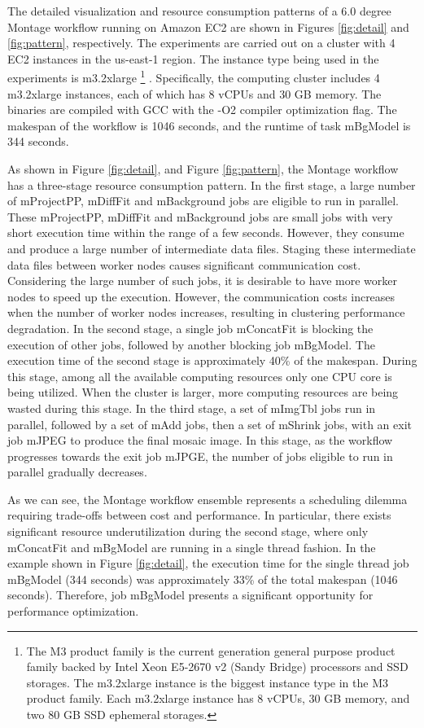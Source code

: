 The detailed visualization and  resource consumption patterns of a 6.0 degree Montage workflow running on Amazon EC2 are shown in Figures \ref{fig:detail} and \ref{fig:pattern}, respectively. The experiments are carried out on a cluster with 4 EC2 instances in the us-east-1 region. The instance type being used in the experiments is m3.2xlarge \footnote{The M3 product family is the current generation general purpose product family backed by Intel Xeon E5-2670 v2 (Sandy Bridge) processors and SSD storages. The m3.2xlarge instance is the biggest instance type in the M3 product family. Each m3.2xlarge instance has 8 vCPUs, 30 GB memory, and two 80 GB SSD ephemeral storages.} . Specifically, the computing cluster includes 4 m3.2xlarge instances, each of which has 8 vCPUs and 30 GB memory. The binaries are compiled with GCC with the -O2 compiler optimization flag. The makespan of the workflow is 1046 seconds, and the runtime of task mBgModel is 344 seconds. 


As shown in Figure  \ref{fig:detail}, and Figure \ref{fig:pattern}, the Montage workflow has a three-stage resource consumption pattern. In the first stage, a large number of mProjectPP, mDiffFit and mBackground jobs are eligible to run in parallel. These mProjectPP, mDiffFit and mBackground jobs are small jobs with very short execution time within the range of a few seconds. However, they consume and produce a large number of intermediate data files. Staging these intermediate data files between worker nodes causes significant communication cost. Considering the large number of such jobs, it is desirable to have more worker nodes to speed up the execution. However, the communication costs increases when the number of worker nodes increases, resulting in clustering performance degradation. In the second stage, a single job mConcatFit is blocking the execution of other jobs, followed by another blocking job mBgModel. The execution time of the second stage is approximately 40\% of the makespan. During this stage, among all the available computing resources only one CPU core is being utilized. When the cluster is larger, more computing resources are being wasted during this stage. In the third stage, a set of mImgTbl jobs run in parallel, followed by a set of mAdd jobs, then a set of mShrink jobs, with an exit job mJPEG to produce the final mosaic image. In this stage, as the workflow progresses towards the exit job mJPGE, the number of jobs eligible to run in parallel gradually decreases. 

As we can see, the Montage workflow ensemble represents a scheduling dilemma requiring trade-offs between cost and performance. In particular, there exists significant resource underutilization during the second stage, where only mConcatFit and mBgModel are running in a single thread fashion. In the example shown in Figure \ref{fig:detail}, the execution time for the single thread job mBgModel (344 seconds) was approximately 33\% of the total makespan (1046 seconds). Therefore, job mBgModel presents a significant opportunity for performance optimization. 


